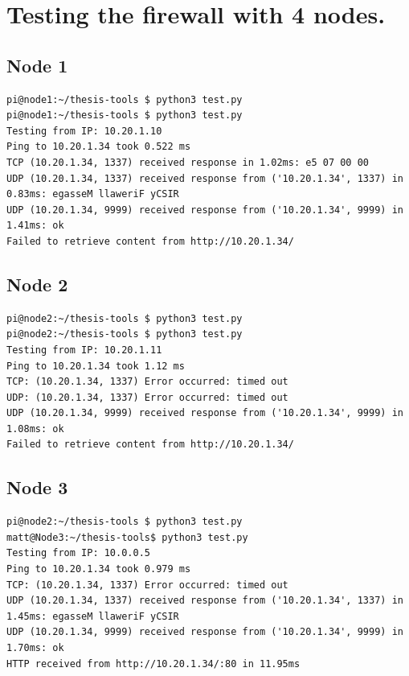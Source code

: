 \section{Testing the firewall with 4 nodes.}
\label{app:testing_pf}

\subsection*{Node 1}
\begin{lstlisting}[style=consoleoutput]pi@node1:~/thesis-tools $ python3 test.py
pi@node1:~/thesis-tools $ python3 test.py
Testing from IP: 10.20.1.10
Ping to 10.20.1.34 took 0.522 ms
TCP (10.20.1.34, 1337) received response in 1.02ms: e5 07 00 00
UDP (10.20.1.34, 1337) received response from ('10.20.1.34', 1337) in 0.83ms: egasseM llaweriF yCSIR
UDP (10.20.1.34, 9999) received response from ('10.20.1.34', 9999) in 1.41ms: ok
Failed to retrieve content from http://10.20.1.34/
\end{lstlisting}

\subsection*{Node 2}
\begin{lstlisting}[style=consoleoutput]pi@node2:~/thesis-tools $ python3 test.py
pi@node2:~/thesis-tools $ python3 test.py
Testing from IP: 10.20.1.11
Ping to 10.20.1.34 took 1.12 ms
TCP: (10.20.1.34, 1337) Error occurred: timed out
UDP: (10.20.1.34, 1337) Error occurred: timed out
UDP (10.20.1.34, 9999) received response from ('10.20.1.34', 9999) in 1.08ms: ok
Failed to retrieve content from http://10.20.1.34/
\end{lstlisting}


\subsection*{Node 3}
\begin{lstlisting}[style=consoleoutput]pi@node2:~/thesis-tools $ python3 test.py
matt@Node3:~/thesis-tools$ python3 test.py
Testing from IP: 10.0.0.5
Ping to 10.20.1.34 took 0.979 ms
TCP: (10.20.1.34, 1337) Error occurred: timed out
UDP (10.20.1.34, 1337) received response from ('10.20.1.34', 1337) in 1.45ms: egasseM llaweriF yCSIR
UDP (10.20.1.34, 9999) received response from ('10.20.1.34', 9999) in 1.70ms: ok
HTTP received from http://10.20.1.34/:80 in 11.95ms
\end{lstlisting}



